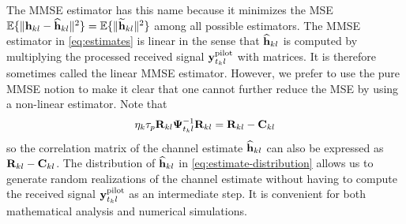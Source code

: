 The  \gls{MMSE} estimator has this name because it minimizes the MSE $\mathbb{E}\{ \| \mathbf{h}_{kl} - \widehat{\mathbf{h}}_{kl} \|^2 \}=\mathbb{E}\{ \| \widetilde{\mathbf{h}}_{kl} \|^2 \}$ among all possible estimators.
The \gls{MMSE} estimator in \eqref{eq:estimates} is linear in the sense that $\widehat{\mathbf{h}}_{kl}$ is computed by multiplying the processed received signal $\mathbf{y}_{t_kl}^{{\rm pilot}}$ with matrices. It is therefore sometimes
called the linear MMSE estimator. However, we prefer to use the pure MMSE notion to make it clear that one cannot further reduce the MSE by using a non-linear estimator. Note that
\begin{equation}
\eta_k \tau_p \mathbf{R}_{kl} \mathbf{\Psi}_{t_kl}^{-1} \mathbf{R}_{kl}  = \mathbf{R}_{kl} - \mathbf{C}_{kl}
\end{equation}
so the correlation matrix of the channel estimate $\widehat{\mathbf{h}}_{kl} $ can also be expressed as $\mathbf{R}_{kl} - \mathbf{C}_{kl}$. The distribution of $\widehat{\mathbf{h}}_{kl}$ in \eqref{eq:estimate-distribution} allows us to generate random realizations of the channel estimate without having to compute the received signal $\mathbf{y}_{t_kl}^{{\rm pilot}}$ as an intermediate step. It is convenient for both mathematical analysis and numerical simulations.

